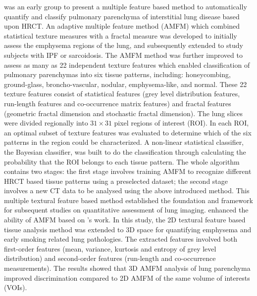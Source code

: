 \cite{uppaluri1999interstitial,uppaluri1999computer} was an early group to present a multiple feature based method to automatically quantify and classify pulmonary parenchyma of interstitial lung disease based upon HRCT. An adaptive multiple feature method (AMFM) which combined statistical texture measures with a fractal measure was developed to initially assess the emphysema regions of the lung, and subsequently extended to study subjects with IPF or sarcoidosis. The AMFM method was further improved to assess as many as 22 independent texture features which enabled classification of pulmonary parenchymas into six tissue patterns, including: honeycombing, ground-glass, broncho-vascular, nodular, emphysema-like, and normal. These 22 texture features consist of statistical features (grey level distribution features, run-length features and co-occurrence matrix features) and fractal features (geometric fractal dimension and stochastic fractal dimension). The lung slices were divided regionally into $31 \times 31$ pixel regions of interest (ROI). In each ROI, an optimal subset of texture features was evaluated to determine which of the six patterns in the region could be characterized. A non-linear statistical classifier, the Bayesian classifier, was built to do the classification through calculating the probability that the ROI belongs to each tissue pattern. The whole algorithm contains two stages: the first stage involves training AMFM to recognize different HRCT based tissue patterns using a preselected dataset; the second stage involves a new CT data to be analysed using the above introduced method. This multiple textural feature based method established the foundation and framework for subsequent studies on quantitative assessment of lung imaging. \cite{xu2006computer,xu2006mdct} enhanced the ability of AMFM based on \cite{uppaluri1999interstitial,uppaluri1999computer}'s work. In this study, the 2D textural feature based tissue analysis method was extended to 3D space for quantifying emphysema and early smoking related lung pathologies. The extracted features involved both first-order features (mean, variance, kurtosis and entropy of grey level distribution) and second-order features (run-length and co-occurrence measurements). The results showed that 3D AMFM analysis of lung parenchyma improved discrimination compared to 2D AMFM of the same volume of interests (VOIs). 

